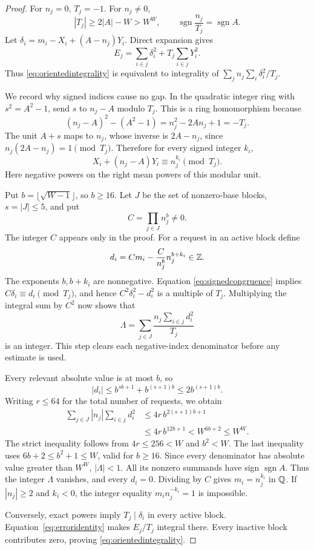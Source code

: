 \begin{proof}
For $n_j=0$, $T_j=-1$. For $n_j\ne0$,
\[
 |T_j|\ge2|A|-W>W^W,
 \qquad\operatorname{sgn}\frac{n_j}{T_j}=\operatorname{sgn}A.
\]
Let $\delta_i=m_i-X_i+(A-n_j)Y_i$. Direct expansion gives
\begin{equation}\label{eq:erroridentity}
 E_j=\sum_{i\in j}\delta_i^2+T_j\sum_{i\in j}Y_i^2.
\end{equation}
Thus \eqref{eq:orientedintegrality} is equivalent to integrality of
$\sum_j n_j\sum_i\delta_i^2/T_j$.

We record why signed indices cause no gap. In the quadratic integer
ring with $s^2=A^2-1$, send $s$ to $n_j-A$ modulo $T_j$. This is a
ring homomorphism because
\[
 (n_j-A)^2-(A^2-1)=n_j^2-2An_j+1=-T_j.
\]
The unit $A+s$ maps to $n_j$, whose inverse is $2A-n_j$, since
$n_j(2A-n_j)=1\pmod{T_j}$. Therefore for every signed integer $k_i$,
\begin{equation}\label{eq:signedcongruence}
 X_i+(n_j-A)Y_i\equiv n_j^{k_i}\pmod{T_j}.
\end{equation}
Here negative powers on the right mean powers of this modular unit.

Put $b=\lfloor\sqrt{W-1}\rfloor$, so $b\ge16$. Let $J$ be the set
of nonzero-base blocks, $s=|J|\le5$, and put
\[
 C=\prod_{j\in J}n_j^b\ne0.
\]
The integer $C$ appears only in the proof. For a request in an active
block define
\[
 d_i=Cm_i-\frac{C}{n_j^b}n_j^{b+k_i}\in\mathbb Z.
\]
The exponents $b,b+k_i$ are nonnegative. Equation
\eqref{eq:signedcongruence} implies
$C\delta_i\equiv d_i\pmod{T_j}$, and hence
$C^2\delta_i^2-d_i^2$ is a multiple of $T_j$.
Multiplying the integral sum by $C^2$ now shows that
\[
 \Lambda=\sum_{j\in J}\frac{n_j\sum_{i\in j}d_i^2}{T_j}
\]
is an integer. This step clears each negative-index denominator before
any estimate is used.

Every relevant absolute value is at most $b$, so
\[
 |d_i|\le b^{sb+1}+b^{(s+1)b}\le2b^{(s+1)b}.
\]
Writing $r\le64$ for the total number of requests, we obtain
\begin{align*}
 \sum_{j\in J}|n_j|\sum_{i\in j}d_i^2
 &\le4r\,b^{2(s+1)b+1}\\
 &\le4r\,b^{12b+1}<W^{6b+2}\le W^W.
\end{align*}
The strict inequality follows from $4r\le256<W$ and $b^2<W$.
The last inequality uses $6b+2\le b^2+1\le W$, valid for $b\ge16$.
Since every denominator has absolute value greater than $W^W$,
$|\Lambda|<1$. All its nonzero summands have sign $\operatorname{sgn}A$.
Thus the integer $\Lambda$ vanishes, and every $d_i=0$. Dividing by
$C$ gives $m_i=n_j^{k_i}$ in $\mathbb Q$. If $|n_j|\ge2$ and $k_i<0$,
the integer equality $m_i n_j^{-k_i}=1$ is impossible.

Conversely, exact powers imply $T_j\mid\delta_i$ in every active
block. Equation~\eqref{eq:erroridentity} makes $E_j/T_j$ integral
there. Every inactive block contributes zero, proving
\eqref{eq:orientedintegrality}.
\end{proof}

